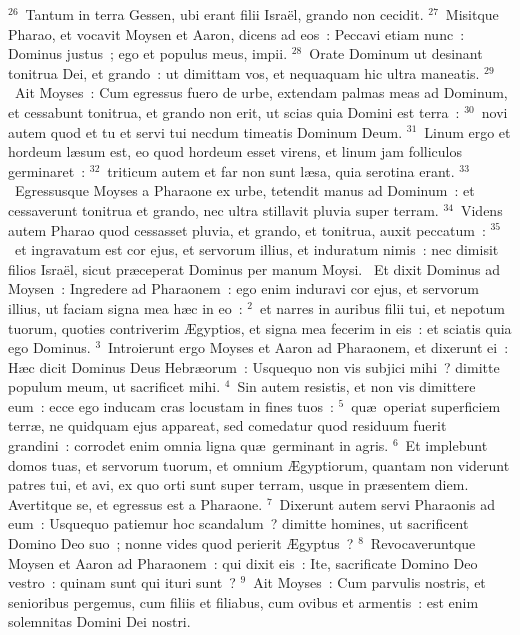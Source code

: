 ${}^{26}$~Tantum in terra Gessen, ubi erant filii Isra\"el, grando non cecidit.
${}^{27}$~Misitque Pharao, et vocavit Moysen et Aaron, dicens ad eos~: Peccavi etiam nunc~: Dominus justus~; ego et populus meus, impii.
${}^{28}$~Orate Dominum ut desinant tonitrua Dei, et grando~: ut dimittam vos, et nequaquam hic ultra maneatis.
${}^{29}$~Ait Moyses~: Cum egressus fuero de urbe, extendam palmas meas ad Dominum, et cessabunt tonitrua, et grando non erit, ut scias quia Domini est terra~:
${}^{30}$~novi autem quod et tu et servi tui necdum timeatis Dominum Deum.
${}^{31}$~Linum ergo et hordeum l\ae sum est, eo quod hordeum esset virens, et linum jam folliculos germinaret~:
${}^{32}$~triticum autem et far non sunt l\ae sa, quia serotina erant.
${}^{33}$~Egressusque Moyses a Pharaone ex urbe, tetendit manus ad Dominum~: et cessaverunt tonitrua et grando, nec ultra stillavit pluvia super terram.
${}^{34}$~Videns autem Pharao quod cessasset pluvia, et grando, et tonitrua, auxit peccatum~:
${}^{35}$~et ingravatum est cor ejus, et servorum illius, et induratum nimis~: nec dimisit filios Isra\"el, sicut pr\ae ceperat Dominus per manum Moysi.
~Et dixit Dominus ad Moysen~: Ingredere ad Pharaonem~: ego enim induravi cor ejus, et servorum illius, ut faciam signa mea h\ae c in eo~:
${}^{2}$~et narres in auribus filii tui, et nepotum tuorum, quoties contriverim \AE gyptios, et signa mea fecerim in eis~: et sciatis quia ego Dominus.
${}^{3}$~Introierunt ergo Moyses et Aaron ad Pharaonem, et dixerunt ei~: H\ae c dicit Dominus Deus Hebr\ae orum~: Usquequo non vis subjici mihi~? dimitte populum meum, ut sacrificet mihi.
${}^{4}$~Sin autem resistis, et non vis dimittere eum~: ecce ego inducam cras locustam in fines tuos~:
${}^{5}$~qu\ae\ operiat superficiem terr\ae , ne quidquam ejus appareat, sed comedatur quod residuum fuerit grandini~: corrodet enim omnia ligna qu\ae\ germinant in agris.
${}^{6}$~Et implebunt domos tuas, et servorum tuorum, et omnium \AE gyptiorum, quantam non viderunt patres tui, et avi, ex quo orti sunt super terram, usque in pr\ae sentem diem. Avertitque se, et egressus est a Pharaone.
${}^{7}$~Dixerunt autem servi Pharaonis ad eum~: Usquequo patiemur hoc scandalum~? dimitte homines, ut sacrificent Domino Deo suo~; nonne vides quod perierit \AE gyptus~?
${}^{8}$~Revocaveruntque Moysen et Aaron ad Pharaonem~: qui dixit eis~: Ite, sacrificate Domino Deo vestro~: quinam sunt qui ituri sunt~?
${}^{9}$~Ait Moyses~: Cum parvulis nostris, et senioribus pergemus, cum filiis et filiabus, cum ovibus et armentis~: est enim solemnitas Domini Dei nostri.
